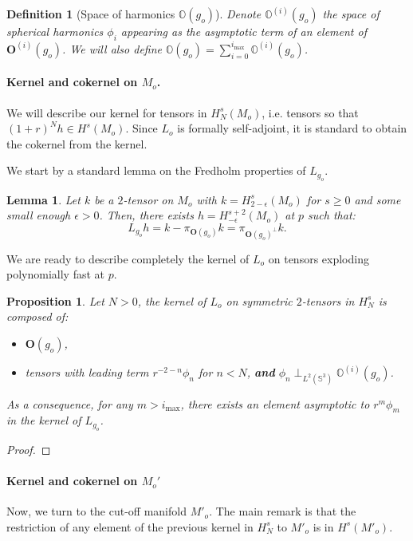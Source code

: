 \documentclass[12pt]{article}
\newtheorem{lem}[thm]{Lemma}
\newtheorem{prop}[thm]{Proposition}
\newtheorem{defn}[thm]{Definition}
\begin{document}
   \begin{defn}[Space of harmonics $\mathbb{O}(g_o)$]
   Denote 
   $ \mathbb{O}^{(i)}({g_o}) $ the space of spherical harmonics $\phi_{i}$ appearing as the asymptotic term of an element of $\mathbf{O}^{(i)}({g_o})$. We will also define $\mathbb{O}({g_o})=\sum_{i=0}^{i_{\max}}\mathbb{O}^{(i)}({g_o})$.
   \end{defn}

\paragraph{Kernel and cokernel on $M_o$.}

We will describe our kernel for tensors in $H^s_N(M_o)$, i.e. tensors so that $ (1+r)^Nh \in H^s(M_o)$. Since $L_o$ is formally self-adjoint, it is standard to obtain the cokernel from the kernel.

We start by a standard lemma on the Fredholm properties of $L_{g_o}$.
\begin{lem}
    Let $k$ be a $2$-tensor on $M_o$ with $k = H^s_{2-\epsilon}(M_o)$ for $s\geqslant0$ and some small enough $\epsilon>0$. Then, there exists $h = H^{s+2}_{-\epsilon}(M_o)$ at $p$ such that:
    $$L_{g_o}h = k-\pi_{\mathbf{O}(g_o)}k = \pi_{\mathbf{O}(g_o)^\perp}k.$$
\end{lem}

We are ready to describe completely the kernel of $L_o$ on tensors exploding polynomially fast at $p$.
\begin{prop}
    Let $N>0$, the kernel of $L_o$ on symmetric $2$-tensors in $H^s_N$ is composed of:
    \begin{itemize}
        \item $\mathbf{O}(g_o)$,
        \item tensors with leading term $ r^{-2-n}\phi_n$ for $n<N$, \textbf{and} $\phi_n \perp_{L^2(\mathbb{S}^3)}\mathbb{O}^{(i)}(g_o) $.
    \end{itemize}
    
As a consequence, for any $m>i_{\max}$, there exists an element asymptotic to $r^m\phi_m$ in the kernel of $L_{g_o}$.
\end{prop}
\begin{proof}
     
    
\end{proof}


\paragraph{Kernel and cokernel on $M_o'$}
    Now, we turn to the cut-off manifold $M'_o$. The main remark is that the restriction of any element of the previous kernel in $H^s_N$ to $M'_o$ is in $H^s(M'_o)$.
\end{document}
